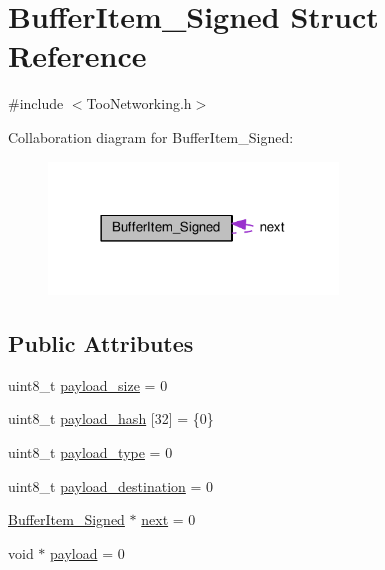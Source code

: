 \hypertarget{structBufferItem__Signed}{}\section{Buffer\+Item\+\_\+\+Signed Struct Reference}
\label{structBufferItem__Signed}


{\ttfamily \#include $<$Too\+Networking.\+h$>$}



Collaboration diagram for Buffer\+Item\+\_\+\+Signed\+:
\nopagebreak
\begin{figure}[H]
\begin{center}
\leavevmode
\includegraphics[width=218pt]{structBufferItem__Signed__coll__graph}
\end{center}
\end{figure}
\subsection*{Public Attributes}
\begin{DoxyCompactItemize}
\item 
uint8\+\_\+t \hyperlink{structBufferItem__Signed_a99af0ec40a5d44a11df8592667fe7614}{payload\+\_\+size} = 0
\item 
uint8\+\_\+t \hyperlink{structBufferItem__Signed_aea55c4b9fa78da421de8f83df370fb57}{payload\+\_\+hash} \mbox{[}32\mbox{]} = \{0\}
\item 
uint8\+\_\+t \hyperlink{structBufferItem__Signed_a75a67331ae70b15b59ba8941313e4fce}{payload\+\_\+type} = 0
\item 
uint8\+\_\+t \hyperlink{structBufferItem__Signed_ad71dae240fb681bedb0c0332fff403fe}{payload\+\_\+destination} = 0
\item 
\hyperlink{structBufferItem__Signed}{Buffer\+Item\+\_\+\+Signed} $\ast$ \hyperlink{structBufferItem__Signed_a86ea87809ef5786a04f1218ac028fa13}{next} = 0
\item 
void $\ast$ \hyperlink{structBufferItem__Signed_a4f268b032fb161b2c73daad2d2659291}{payload} = 0
\end{DoxyCompactItemize}


